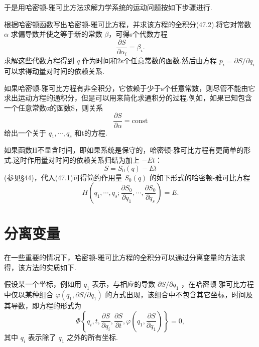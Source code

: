 于是用哈密顿-雅可比方法求解力学系统的运动问题按如下步骤进行.

根据哈密顿函数写出哈密顿-雅可比方程，并求该方程的全积分(47.2).将它对常数
$\alpha$ 求偏导数并使之等于新的常数 $\beta$，可得s个代数方程
\begin{equation}
  \frac{\partial S}{\partial\alpha_i}=\beta_i.
\end{equation}
求解这些代数方程得到 $q$
作为时间和2s个任意常数的函数.然后由方程 $p_i=\partial S/\partial q_i$
可以求得动量对时间的依赖关系.

如果哈密顿-雅可比方程有非全积分，它依赖于少于s个任意常数，则尽管不能由它求出运动方程的通积分，但是可以用来简化求通积分的过程.例如，如果已知包含一个任意常数α的函数S，则关系
\begin{equation*}
  \frac{\partial S}{\partial\alpha}=\mathrm{const}
\end{equation*}
给出一个关于 $q_1,\cdots,q_s$ 和t的方程.

如果函数H不显含时间，即如果系统是保守的，哈密顿-雅可比方程有更简单的形式.这时作用量对时间的依赖关系归结为加上
$-Et$：
\begin{equation}
  S=S_0(q)-Et
\end{equation}
(参见§44)，代入(47.1)可得简约作用量 $S_0(q)$ 的如下形式的哈密顿-雅可比方程
\begin{equation}
  H\left(q_1,\cdots,q_s;\frac{\partial S_0}{\partial q_1},\cdots,
  \frac{\partial S_0}{\partial q_s}\right)=E.
\end{equation}

\section{分离变量}

在一些重要的情况下，哈密顿-雅可比方程的全积分可以通过分离变量的方法求得，该方法的实质如下.

假设某一个坐标，例如用 $q_1$ 表示，与相应的导数 $\partial S/\partial q_1$
，在哈密顿-雅可比方程中仅以某种组合 $\varphi(q_1,\partial S/\partial q_1)$
的方式出现，该组合中不包含其它坐标，时间及其导数，即方程的形式为
\begin{equation}
  \Phi\left\{q_i,t,\frac{\partial S}{\partial q_i},
  \frac{\partial S}{\partial t},
  \varphi\left(q_1,\frac{\partial S}{\partial q_1}\right)\right\}=0,
\end{equation}
其中 $q_i$ 表示除了 $q_1$ 之外的所有坐标.

